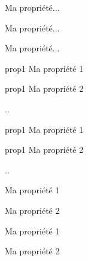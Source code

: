 \documentclass[a4paper,12pt]{article}
\begin{document}
\begin{propriete}
	Ma propriété...
\end{propriete}%

\begin{code}%
\begin{propriete*}
	Ma propriété...
\end{propriete*}
\end{code}

\begin{propriete*}
	Ma propriété...
\end{propriete*}%

\begin{code}%
\begin{proprietes}
	\item[prop1] Ma propriété 1
	\item[prop1] Ma propriété 2
	\item ..
\end{proprietes}
\end{code}

\begin{proprietes}
	\item[prop1] Ma propriété 1
	\item[prop1] Ma propriété 2
	\item ..
\end{proprietes}%

\begin{code}%
\begin{proprietes*}
	\item Ma propriété 1
	\item Ma propriété 2
\end{proprietes*}
\end{code}

\begin{proprietes*}
	\item Ma propriété 1
	\item Ma propriété 2
\end{proprietes*}%
\end{document}

